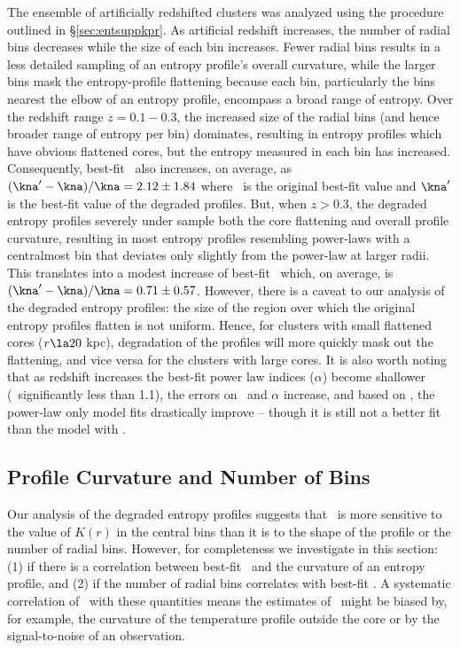 The ensemble of artificially redshifted clusters was analyzed using
the procedure outlined in \S\ref{sec:entsuppkpr}. As artificial redshift
increases, the number of radial bins decreases while the size of each
bin increases. Fewer radial bins results in a less detailed sampling
of an entropy profile's overall curvature, while the larger bins mask
the entropy-profile flattening because each bin, particularly the bins
nearest the elbow of an entropy profile, encompass a broad range of
entropy. Over the redshift range $z = 0.1-0.3$, the increased size of
the radial bins (and hence broader range of entropy per bin)
dominates, resulting in entropy profiles which have obvious flattened
cores, but the entropy measured in each bin has
increased. Consequently, best-fit \kna\ also increases, on average, as
$\dkna = 2.12 \pm 1.84$ where \kna\ is the original best-fit value and
$\kna^{\prime}$ is the best-fit value of the degraded profiles. But,
when $z > 0.3$, the degraded entropy profiles severely under sample
both the core flattening and overall profile curvature, resulting in
most entropy profiles resembling power-laws with a centralmost bin
that deviates only slightly from the power-law at larger radii. This
translates into a modest increase of best-fit \kna\ which, on average,
is $\dkna = 0.71 \pm 0.57$. However, there is a caveat to our analysis
of the degraded entropy profiles: the size of the region over which
the original entropy profiles flatten is not uniform. Hence, for
clusters with small flattened cores ($r \la 20$ kpc), degradation of
the profiles will more quickly mask out the flattening, and vice versa
for the clusters with large cores. It is also worth noting that as
redshift increases the best-fit power law indices ($\alpha$) become
shallower (\ie\ significantly less than 1.1), the errors on \kna\ and
$\alpha$ increase, and based on \chisq, the power-law only model fits
drastically improve -- though it is still not a better fit than the
model with \kna.

\subsection{Profile Curvature and Number of Bins}
\label{sec:entsuppcurve}

Our analysis of the degraded entropy profiles suggests that \kna\ is
more sensitive to the value of $K(r)$ in the central bins than it is
to the shape of the profile or the number of radial bins. However, for
completeness we investigate in this section: (1) if there is a
correlation between best-fit \kna\ and the curvature of an entropy
profile, and (2) if the number of radial bins correlates with best-fit
\kna. A systematic correlation of \kna\ with these quantities means
the estimates of \kna\ might be biased by, for example, the curvature
of the temperature profile outside the core or by the signal-to-noise
of an observation.

